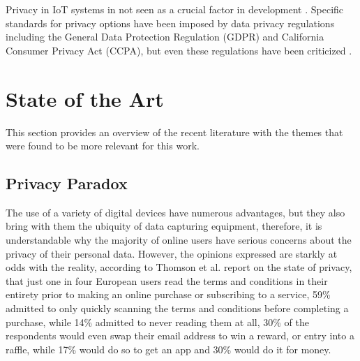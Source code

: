 \documentclass[manuscript,screen,review,natbib=false]{acmart}
\begin{document}
Privacy in IoT systems in not seen as a crucial factor in development \cite{alhirabi2021security}.
Specific standards for privacy options have been imposed by data privacy
regulations including the General Data Protection Regulation (GDPR) and
California Consumer Privacy Act (CCPA), but even these regulations have
been criticized \cite{peloquin2020disruptive, gladis2022weaponizing, gentile2022deficient, green2022flaws, byun2019privacy}.

\section{State of the Art}

\par
This section provides an overview of the recent literature with the themes
that were found to be more relevant for this work.

\subsection{Privacy Paradox}

The use of a variety of digital devices have numerous advantages, but they
also bring with them the ubiquity of data capturing equipment, therefore,
it is understandable why the majority of online users have serious concerns
about the privacy of their personal data. However, the opinions expressed
are starkly at odds with the reality, according to Thomson et al. \cite{DarrenState}
report on the state of privacy, that just one in four European users read
the terms and conditions in their entirety prior to making an online purchase
or subscribing to a service, 59\% admitted to only quickly scanning the
terms and conditions before completing a purchase, while 14\% admitted to
never reading them at all, 30\% of the respondents would even swap their
email address to win a reward, or entry into a raffle, while 17\% would do
so to get an app and 30\% would do it for money.
\end{document}
